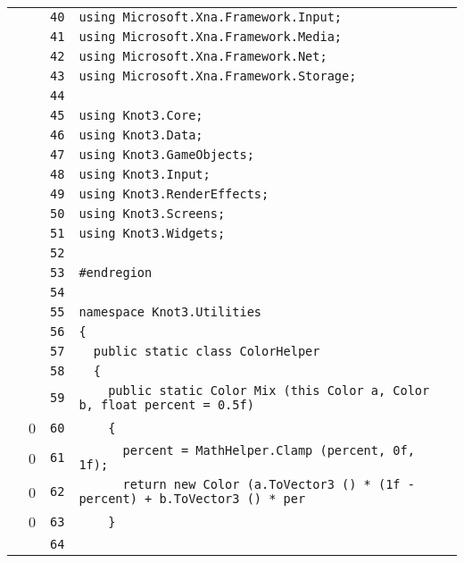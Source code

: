 \documentclass[a4paper,10pt]{article}
\begin{document}
\begin{longtable}[l]{lrrl}
\cellcolor{gray} &  & \verb~40~ & \verb~using Microsoft.Xna.Framework.Input;~\\
\cellcolor{gray} &  & \verb~41~ & \verb~using Microsoft.Xna.Framework.Media;~\\
\cellcolor{gray} &  & \verb~42~ & \verb~using Microsoft.Xna.Framework.Net;~\\
\cellcolor{gray} &  & \verb~43~ & \verb~using Microsoft.Xna.Framework.Storage;~\\
\cellcolor{gray} &  & \verb~44~ & \verb~~\\
\cellcolor{gray} &  & \verb~45~ & \verb~using Knot3.Core;~\\
\cellcolor{gray} &  & \verb~46~ & \verb~using Knot3.Data;~\\
\cellcolor{gray} &  & \verb~47~ & \verb~using Knot3.GameObjects;~\\
\cellcolor{gray} &  & \verb~48~ & \verb~using Knot3.Input;~\\
\cellcolor{gray} &  & \verb~49~ & \verb~using Knot3.RenderEffects;~\\
\cellcolor{gray} &  & \verb~50~ & \verb~using Knot3.Screens;~\\
\cellcolor{gray} &  & \verb~51~ & \verb~using Knot3.Widgets;~\\
\cellcolor{gray} &  & \verb~52~ & \verb~~\\
\cellcolor{gray} &  & \verb~53~ & \verb~#endregion~\\
\cellcolor{gray} &  & \verb~54~ & \verb~~\\
\cellcolor{gray} &  & \verb~55~ & \verb~namespace Knot3.Utilities~\\
\cellcolor{gray} &  & \verb~56~ & \verb~{~\\
\cellcolor{gray} &  & \verb~57~ & \verb~  public static class ColorHelper~\\
\cellcolor{gray} &  & \verb~58~ & \verb~  {~\\
\cellcolor{gray} &  & \verb~59~ & \verb~    public static Color Mix (this Color a, Color b, float percent = 0.5f)~\\
\cellcolor{red} & 0 & \verb~60~ & \verb~    {~\\
\cellcolor{red} & 0 & \verb~61~ & \verb~      percent = MathHelper.Clamp (percent, 0f, 1f);~\\
\cellcolor{red} & 0 & \verb~62~ & \verb~      return new Color (a.ToVector3 () * (1f - percent) + b.ToVector3 () * per~\\
\cellcolor{red} & 0 & \verb~63~ & \verb~    }~\\
\cellcolor{gray} &  & \verb~64~ & \verb~~\\

\end{longtable}
\end{document}
